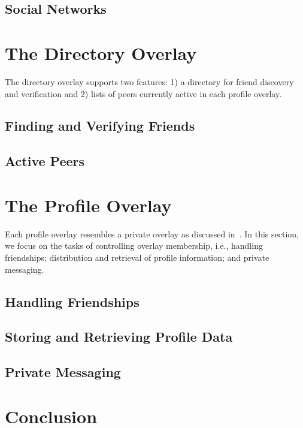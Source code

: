 \documentclass[letterpaper,twocolumn,10pt]{article}
\begin{document}
\subsection{Social Networks}

\section{The Directory Overlay}
\label{directory_overlay}
The directory overlay supports two features:  1) a directory for friend
discovery and verification and 2) lists of peers currently active in each
profile overlay.

\subsection{Finding and Verifying Friends}
\subsection{Active Peers}

\section{The Profile Overlay}
\label{profile_overlay}
Each profile overlay resembles a private overlay as discussed in~\cite{icdcs10}.
In this section, we focus on the tasks of controlling overlay membership, i.e.,
handling friendships; distribution and retrieval of profile information; and
private messaging.

\subsection{Handling Friendships}
\subsection{Storing and Retrieving Profile Data}
\subsection{Private Messaging}

\section{Conclusion}
\label{conclusion}


\small{

\suppressfloats
}
\end{document}
